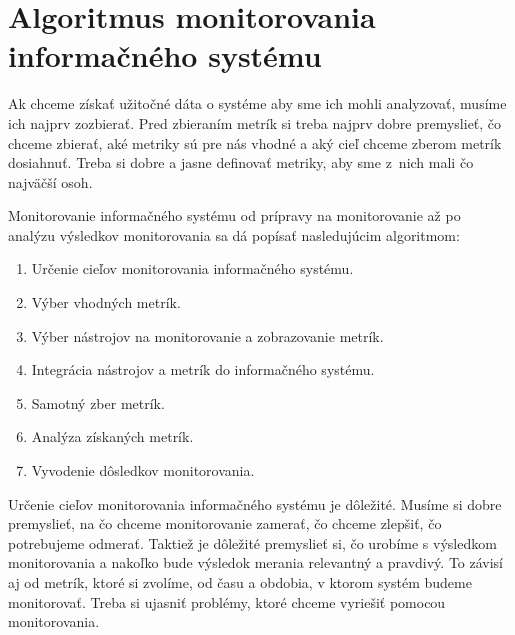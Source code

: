 \documentclass[a4paper, usesections, upjsfrontpage, thesismargins, thesislinespacing, twoside]{rnthesissvk}
\begin{document}
\newpage



\section{Algoritmus monitorovania informačného systému}

Ak chceme získať užitočné dáta o systéme aby sme ich mohli analyzovať, musíme ich najprv zozbierať.
Pred zbieraním metrík si treba najprv dobre premyslieť, čo chceme zbierať, 
aké metriky sú pre nás vhodné a aký cieľ chceme zberom metrík dosiahnuť.
Treba si dobre a jasne definovať metriky, aby sme z~nich mali čo najväčší osoh.


Monitorovanie informačného systému od prípravy na monitorovanie až po analýzu výsledkov monitorovania sa dá popísať nasledujúcim algoritmom:

\begin{enumerate}
	\item Určenie cieľov monitorovania informačného systému.
	\item Výber vhodných metrík.
	\item Výber nástrojov na monitorovanie a zobrazovanie metrík.
	\item Integrácia nástrojov a metrík do informačného systému.
	\item Samotný zber metrík.
	\item Analýza získaných metrík.
	\item Vyvodenie dôsledkov monitorovania.
\end{enumerate}

Určenie cieľov monitorovania informačného systému je dôležité.
Musíme si dobre premyslieť, na čo chceme monitorovanie zamerať, čo chceme zlepšiť, čo potrebujeme odmerať.
Taktiež je dôležité premyslieť si, čo urobíme s výsledkom monitorovania a nakoľko bude výsledok merania relevantný a pravdivý.
To závisí aj od metrík, ktoré si zvolíme, od času a obdobia, v ktorom systém budeme monitorovať.
Treba si ujasniť problémy, ktoré chceme vyriešiť pomocou monitorovania.
\end{document}
